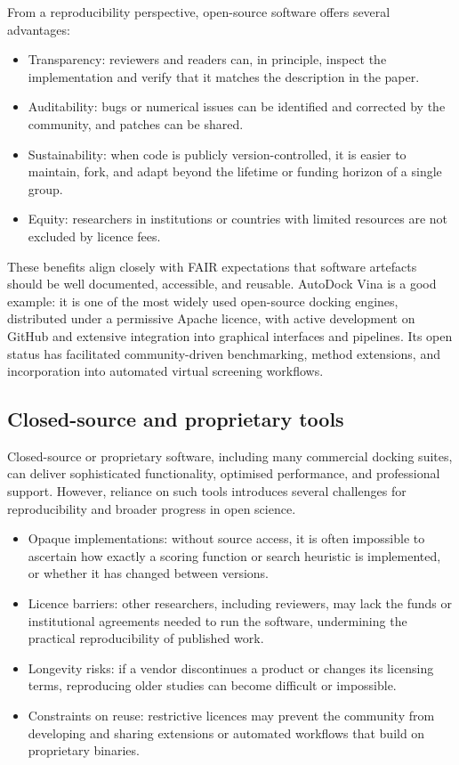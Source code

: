 \documentclass[12pt]{article}
\begin{document}
From a reproducibility perspective, open-source software offers several advantages:
\begin{itemize}
  \item Transparency: reviewers and readers can, in principle, inspect the implementation and verify that it matches the description in the paper.
  \item Auditability: bugs or numerical issues can be identified and corrected by the community, and patches can be shared.
  \item Sustainability: when code is publicly version-controlled, it is easier to maintain, fork, and adapt beyond the lifetime or funding horizon of a single group.
  \item Equity: researchers in institutions or countries with limited resources are not excluded by licence fees.
\end{itemize}

These benefits align closely with FAIR expectations that software artefacts should be well documented, accessible, and reusable\cite{CH12_goFairPrinciples,CH12_tenCleanOSS,CH12_barba2022role}. AutoDock Vina is a good example: it is one of the most widely used open-source docking engines, distributed under a permissive Apache licence, with active development on GitHub and extensive integration into graphical interfaces and pipelines\cite{CH12_trott2010vina,CH12_autodockVinaGit}. Its open status has facilitated community-driven benchmarking, method extensions, and incorporation into automated virtual screening workflows.

\subsection{Closed-source and proprietary tools}

Closed-source or proprietary software, including many commercial docking suites, can deliver sophisticated functionality, optimised performance, and professional support. However, reliance on such tools introduces several challenges for reproducibility and broader progress in open science\cite{CH12_rigorRepro2020,CH12_barba2022role}.

\begin{itemize}
  \item Opaque implementations: without source access, it is often impossible to ascertain how exactly a scoring function or search heuristic is implemented, or whether it has changed between versions.
  \item Licence barriers: other researchers, including reviewers, may lack the funds or institutional agreements needed to run the software, undermining the practical reproducibility of published work.
  \item Longevity risks: if a vendor discontinues a product or changes its licensing terms, reproducing older studies can become difficult or impossible.
  \item Constraints on reuse: restrictive licences may prevent the community from developing and sharing extensions or automated workflows that build on proprietary binaries.
\end{itemize}
\end{document}
